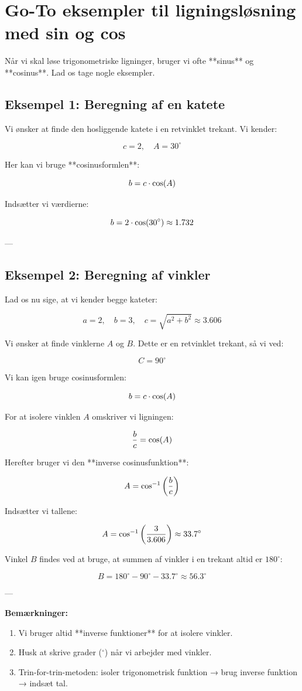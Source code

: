 \section{Go-To eksempler til ligningsløsning med sin og cos}

Når vi skal løse trigonometriske ligninger, bruger vi ofte **sinus** og **cosinus**. Lad os tage nogle eksempler.

\subsection*{Eksempel 1: Beregning af en katete}
Vi ønsker at finde den hosliggende katete i en retvinklet trekant. Vi kender: 

\[
c = 2, \quad A = 30^\circ
\]

Her kan vi bruge **cosinusformlen**:

\[
b = c \cdot \operatorname{cos}(A)
\]

Indsætter vi værdierne:

\[
b = 2 \cdot \operatorname{cos}(30^\circ) \approx 1.732
\]

---

\subsection*{Eksempel 2: Beregning af vinkler}
Lad os nu sige, at vi kender begge kateter:

\[
a = 2, \quad b = 3, \quad c = \sqrt{a^2 + b^2} \approx 3.606
\]

Vi ønsker at finde vinklerne \(A\) og \(B\). Dette er en retvinklet trekant, så vi ved:

\[
C = 90^\circ
\]

Vi kan igen bruge cosinusformlen:

\[
b = c \cdot \operatorname{cos}(A)
\]

For at isolere vinklen \(A\) omskriver vi ligningen:

\[
\frac{b}{c} = \operatorname{cos}(A)
\]

Herefter bruger vi den **inverse cosinusfunktion**:

\[
A = \operatorname{cos}^{-1}\left(\frac{b}{c}\right)
\]

Indsætter vi tallene:

\[
A = \operatorname{cos}^{-1}\left(\frac{3}{3.606}\right) \approx 33.7^\circ
\]

Vinkel \(B\) findes ved at bruge, at summen af vinkler i en trekant altid er \(180^\circ\):

\[
B = 180^\circ - 90^\circ - 33.7^\circ \approx 56.3^\circ
\]

---

\textbf{Bemærkninger:}
\begin{enumerate}
    \item Vi bruger altid **inverse funktioner** for at isolere vinkler. 
    \item Husk at skrive grader (\(^\circ\)) når vi arbejder med vinkler.  
    \item Trin-for-trin-metoden: isoler trigonometrisk funktion → brug inverse funktion → indsæt tal.
\end{enumerate}
